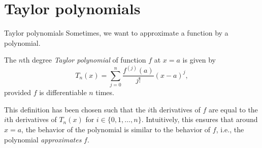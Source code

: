 \iffalse

MIT License

Copyright (c) 2023 Aron Hardeman

Permission is hereby granted, free of charge, to any person obtaining a copy
of this software and associated documentation files (the "Software"), to deal
in the Software without restriction, including without limitation the rights
to use, copy, modify, merge, publish, distribute, sublicense, and/or sell
copies of the Software, and to permit persons to whom the Software is
furnished to do so, subject to the following conditions:

The above copyright notice and this permission notice shall be included in all
copies or substantial portions of the Software.

THE SOFTWARE IS PROVIDED "AS IS", WITHOUT WARRANTY OF ANY KIND, EXPRESS OR
IMPLIED, INCLUDING BUT NOT LIMITED TO THE WARRANTIES OF MERCHANTABILITY,
FITNESS FOR A PARTICULAR PURPOSE AND NONINFRINGEMENT. IN NO EVENT SHALL THE
AUTHORS OR COPYRIGHT HOLDERS BE LIABLE FOR ANY CLAIM, DAMAGES OR OTHER
LIABILITY, WHETHER IN AN ACTION OF CONTRACT, TORT OR OTHERWISE, ARISING FROM,
OUT OF OR IN CONNECTION WITH THE SOFTWARE OR THE USE OR OTHER DEALINGS IN THE
SOFTWARE.

\fi
\section{Taylor polynomials}
\begin{frame}{Taylor polynomials}
    Sometimes, we want to approximate a function by a polynomial.

    The $n$th degree \emph{Taylor polynomial} of function $f$ at $x=a$ is given by
    \pause\[T_n(x)=\sum_{j=0}^n\frac{f^{(j)}(a)}{j!}(x-a)^j,\]
    provided $f$ is differentiable $n$ times.

    \pause\color{gray}This definition has been chosen such that the $i$th derivatives of $f$ are equal to the $i$th derivatives of $T_n(x)$ for $i\in\{0,1,\dots,n\}$. Intuitively, this ensures that around $x=a$, the behavior of the polynomial is similar to the behavior of $f$, i.e., the polynomial \emph{approximates} $f$.
\end{frame}


